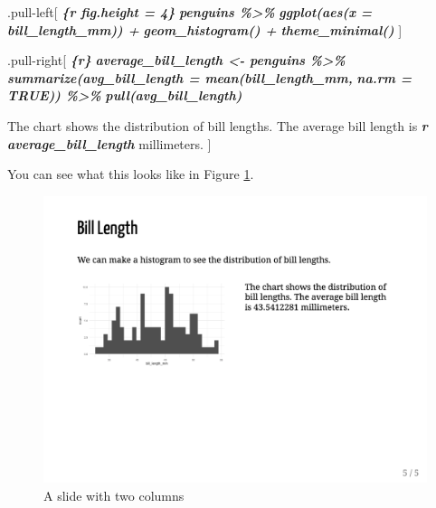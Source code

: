 \documentclass[
]{book}
\newenvironment{Shaded}{\begin{snugshade}}{\end{snugshade}}
\newcommand{\InformationTok}[1]{\textcolor[rgb]{0.56,0.35,0.01}{\textbf{\textit{#1}}}}
\newcommand{\NormalTok}[1]{#1}
\begin{document}
\begin{Shaded}
\begin{Highlighting}[]
\NormalTok{.pull{-}left[}
\InformationTok{\textasciigrave{}\textasciigrave{}\textasciigrave{}\{r fig.height = 4\}}
\InformationTok{penguins \%\textgreater{}\% }
\InformationTok{  ggplot(aes(x = bill\_length\_mm)) +}
\InformationTok{  geom\_histogram() +}
\InformationTok{  theme\_minimal()}
\InformationTok{\textasciigrave{}\textasciigrave{}\textasciigrave{}}
\NormalTok{]}

\NormalTok{.pull{-}right[}
\InformationTok{\textasciigrave{}\textasciigrave{}\textasciigrave{}\{r\}}
\InformationTok{average\_bill\_length \textless{}{-} penguins \%\textgreater{}\% }
\InformationTok{  summarize(avg\_bill\_length = mean(bill\_length\_mm,}
\InformationTok{                                   na.rm = TRUE)) \%\textgreater{}\% }
\InformationTok{  pull(avg\_bill\_length)}
\InformationTok{\textasciigrave{}\textasciigrave{}\textasciigrave{}}

\NormalTok{The chart shows the distribution of bill lengths. The average bill length is }\InformationTok{\textasciigrave{}r average\_bill\_length\textasciigrave{}}\NormalTok{ millimeters.}
\NormalTok{]}
\end{Highlighting}
\end{Shaded}

You can see what this looks like in Figure \ref{fig:slide-two-columns}.

\begin{figure}
\includegraphics[width=1\linewidth]{assets/slide-two-columns} \caption{A slide with two columns}\label{fig:slide-two-columns}
\end{figure}
\end{document}
